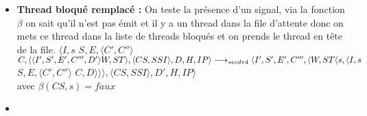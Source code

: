 \documentclass[10pt,a4paper]{article}
\begin{document}
\begin{enumerate}
\begin{itemize}
						
						\item[] \textbf{ Thread bloqué remplacé :} On teste la présence d'un signal, via la fonction $\beta$ on sait qu'il n'est pas émit et il y a un thread dans la file d'attente
						donc on mets ce thread dans la liste de threads bloqués et on prends le thread en tête de la file.
						\smallbreak
						$\langle I,s$ $S,E,\langle C',C''\rangle$ $C,\langle\langle I',S',E',C''',D'\rangle W,ST\rangle,\langle CS,SSI\rangle,D,H,IP\rangle 
						\\\longrightarrow_{secdv4} \langle I',S',E',C''',\langle W,ST\langle s,\langle I,s$ $S,E,\langle C',C''\rangle$ $C,D\rangle\rangle\rangle,\langle CS,SSI\rangle,D',H,IP\rangle$ \\
						avec $\beta(CS,s) = faux$
						\item[]	
						

\end{itemize}
\end{enumerate}
\end{document}
